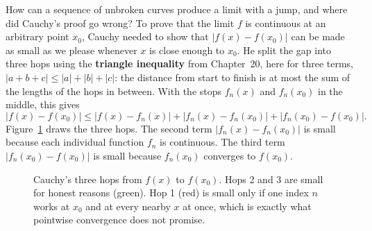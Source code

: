 How can a sequence of unbroken curves produce a limit with a jump, and where did Cauchy's proof go wrong? To prove that the limit $f$ is continuous at an arbitrary point $x_0$, Cauchy needed to show that $|f(x) - f(x_0)|$ can be made as small as we please whenever $x$ is close enough to $x_0$. He split the gap into three hops using the \textbf{triangle inequality} from Chapter~20, here for three terms, $|a + b + c| \le |a| + |b| + |c|$: the distance from start to finish is at most the sum of the lengths of the hops in between. With the stops $f_n(x)$ and $f_n(x_0)$ in the middle, this gives
\[
|f(x) - f(x_0)| \le |f(x) - f_n(x)| + |f_n(x) - f_n(x_0)| + |f_n(x_0) - f(x_0)|.
\]
Figure~\ref{fig:qo-three-hops} draws the three hops.
The second term $|f_n(x) - f_n(x_0)|$ is small because each individual function $f_n$ is continuous. The third term $|f_n(x_0) - f(x_0)|$ is small because $f_n(x_0)$ converges to $f(x_0)$.

\begin{figure}[htbp]
\centering
{}
\caption{Cauchy's three hops from $f(x)$ to $f(x_0)$. Hops 2 and 3 are small for honest reasons (green). Hop 1 (red) is small only if one index $n$ works at $x_0$ and at every nearby $x$ at once, which is exactly what pointwise convergence does not promise.}
\label{fig:qo-three-hops}
\end{figure}


